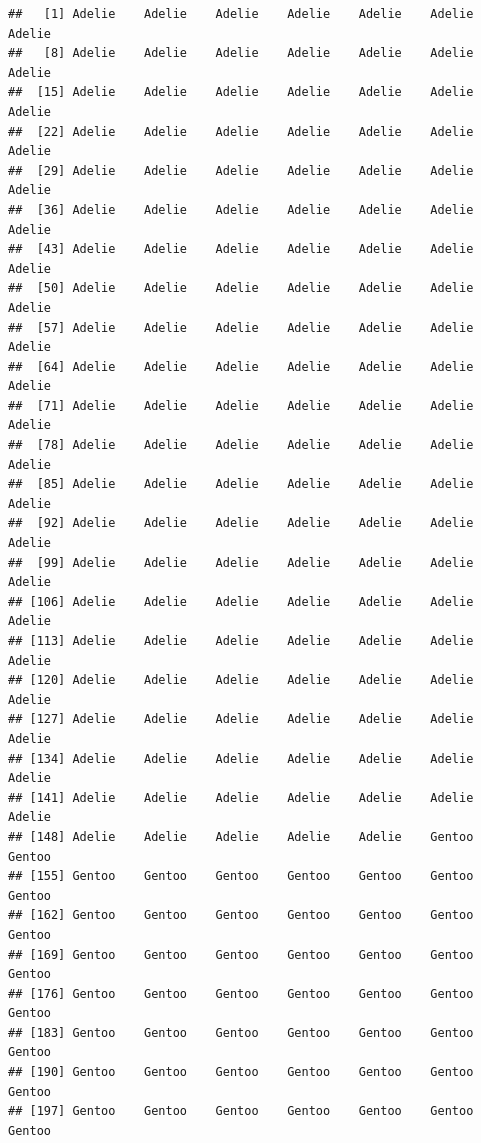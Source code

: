 \documentclass[
]{book}
\newenvironment{Shaded}{\begin{snugshade}}{\end{snugshade}}
\newcommand{\NormalTok}[1]{#1}
\newcommand{\SpecialCharTok}[1]{\textcolor[rgb]{0.81,0.36,0.00}{\textbf{#1}}}
\begin{document}
\begin{Shaded}
\end{Shaded}

\begin{verbatim}
##   [1] Adelie    Adelie    Adelie    Adelie    Adelie    Adelie    Adelie   
##   [8] Adelie    Adelie    Adelie    Adelie    Adelie    Adelie    Adelie   
##  [15] Adelie    Adelie    Adelie    Adelie    Adelie    Adelie    Adelie   
##  [22] Adelie    Adelie    Adelie    Adelie    Adelie    Adelie    Adelie   
##  [29] Adelie    Adelie    Adelie    Adelie    Adelie    Adelie    Adelie   
##  [36] Adelie    Adelie    Adelie    Adelie    Adelie    Adelie    Adelie   
##  [43] Adelie    Adelie    Adelie    Adelie    Adelie    Adelie    Adelie   
##  [50] Adelie    Adelie    Adelie    Adelie    Adelie    Adelie    Adelie   
##  [57] Adelie    Adelie    Adelie    Adelie    Adelie    Adelie    Adelie   
##  [64] Adelie    Adelie    Adelie    Adelie    Adelie    Adelie    Adelie   
##  [71] Adelie    Adelie    Adelie    Adelie    Adelie    Adelie    Adelie   
##  [78] Adelie    Adelie    Adelie    Adelie    Adelie    Adelie    Adelie   
##  [85] Adelie    Adelie    Adelie    Adelie    Adelie    Adelie    Adelie   
##  [92] Adelie    Adelie    Adelie    Adelie    Adelie    Adelie    Adelie   
##  [99] Adelie    Adelie    Adelie    Adelie    Adelie    Adelie    Adelie   
## [106] Adelie    Adelie    Adelie    Adelie    Adelie    Adelie    Adelie   
## [113] Adelie    Adelie    Adelie    Adelie    Adelie    Adelie    Adelie   
## [120] Adelie    Adelie    Adelie    Adelie    Adelie    Adelie    Adelie   
## [127] Adelie    Adelie    Adelie    Adelie    Adelie    Adelie    Adelie   
## [134] Adelie    Adelie    Adelie    Adelie    Adelie    Adelie    Adelie   
## [141] Adelie    Adelie    Adelie    Adelie    Adelie    Adelie    Adelie   
## [148] Adelie    Adelie    Adelie    Adelie    Adelie    Gentoo    Gentoo   
## [155] Gentoo    Gentoo    Gentoo    Gentoo    Gentoo    Gentoo    Gentoo   
## [162] Gentoo    Gentoo    Gentoo    Gentoo    Gentoo    Gentoo    Gentoo   
## [169] Gentoo    Gentoo    Gentoo    Gentoo    Gentoo    Gentoo    Gentoo   
## [176] Gentoo    Gentoo    Gentoo    Gentoo    Gentoo    Gentoo    Gentoo   
## [183] Gentoo    Gentoo    Gentoo    Gentoo    Gentoo    Gentoo    Gentoo   
## [190] Gentoo    Gentoo    Gentoo    Gentoo    Gentoo    Gentoo    Gentoo   
## [197] Gentoo    Gentoo    Gentoo    Gentoo    Gentoo    Gentoo    Gentoo   

\end{verbatim}
\end{document}
